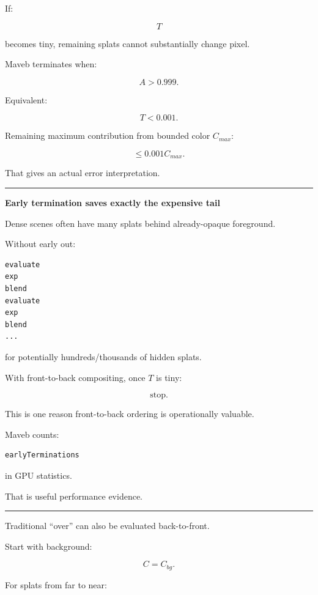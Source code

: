 If:

\[
T
\]

becomes tiny, remaining splats cannot substantially change pixel.

Maveb terminates when:

\[
A>0.999.
\]

Equivalent:

\[
\boxed{
T<0.001.
}
\]

Remaining maximum contribution from bounded color \(C_{max}\):

\[
\le
0.001C_{max}.
\]

That gives an actual error interpretation.

\begin{center}\rule{0.5\linewidth}{0.5pt}\end{center}

\textbf{Early termination saves exactly the expensive tail}

Dense scenes often have many splats behind already-opaque foreground.

Without early out:

\protect{}\label{ss9s8z}%
\begin{verbatim}
evaluate
exp
blend
evaluate
exp
blend
...
\end{verbatim}

for potentially hundreds/thousands of hidden splats.

With front-to-back compositing, once \(T\) is tiny:

\[
\boxed{\text{stop}.}
\]

This is one reason front-to-back ordering is operationally valuable.

Maveb counts:

\protect{}\label{7ar1nv}%
\begin{verbatim}
earlyTerminations
\end{verbatim}

in GPU statistics.

That is useful performance evidence.

\begin{center}\rule{0.5\linewidth}{0.5pt}\end{center}

Traditional ``over'' can also be evaluated back-to-front.

Start with background:

\[
C=C_{bg}.
\]

For splats from far to near:

